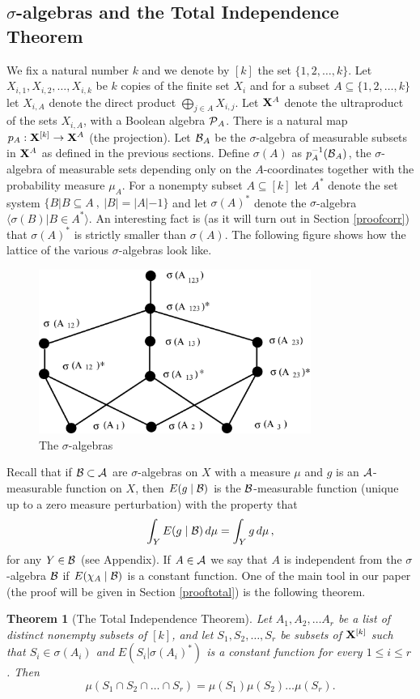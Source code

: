 \documentclass [11pt] {article}
\newtheorem{theorem}{Theorem}
\def\cA{\mbox{$\cal A$}}
\def\cB{\mbox{$\cal B$}}
\def\cA{\mbox{$\cal A$}}
\def\cB{\mbox{$\cal B$}}
\def\cP{\mbox{$\cal P$}}
\def\to{\rightarrow}
\def\xo{{\bf X}}
\def\xok{\xo^{[k]}}
\begin{document}
\subsection{$\sigma$-algebras and the Total Independence
  Theorem}
We fix a natural number $k$ and we denote by $[k]$ the set $\{1,2,\dots,k\}$.
 Let $X_{i,1},X_{i,2},\dots,X_{i,k}$ be $k$ copies of the finite set $X_i$ and
 for a subset
 $A\subseteq\{1,2,\dots,k\}$ let $X_{i,A}$ denote the direct
 product $\bigoplus_{j\in A}X_{i,j}$.
Let $\xo^A$ denote the ultraproduct of the sets $X_{i,A}$, with a Boolean
algebra $\cP_A$.
 There is a natural
 map $p_A:\xok\to \xo^A$ (the projection). Let $\cB_A$ be the
$\sigma$-algebra of measurable subsets in $\xo^A$ as defined in the previous
sections. Define $\sigma(A)$ as $p_A^{-1}(\cB_A)$, the $\sigma$-algebra
of measurable sets depending only on the $A$-coordinates together with
the probability measure $\mu_A$.
For a nonempty subset $A\subseteq [k]$ let $A^*$ denote the
set system $\{B|B\subseteq
A~,~|B|=|A|-1\}$ and let $\sigma(A)^*$ denote the $\sigma$-algebra $\langle
\sigma(B)|B\in A^*\rangle$. An interesting fact is (as it will turn out in
Section \ref{proofcorr}) that $\sigma(A)^*$ is strictly smaller
than $\sigma(A)$. The following figure shows how the lattice of the
various $\sigma$-algebras look like.
\begin{figure}[h]
 \begin{center}
    \includegraphics[width=3.5in]{SAVE.eps}
 \end{center}

  \caption{The $\sigma$-algebras}
  \label{fig-label}
\end{figure}
Recall that if $\cB\subset\cA$ are $\sigma$-algebras on $X$ with  a measure
$\mu$
 and
$g$ is an $\cA$-measurable function on $X$, then $E(g\mid \cB)$ is
the $\cB$-measurable function (unique up to a zero measure perturbation)
 with the property
that
$$\int_Y E(g\mid \cB)\,d\mu=\int_Y g \,d\mu\,,$$
for any $Y\in\cB$ (see Appendix).
If $A\in\cA$ we say that $A$ is independent from the $\sigma$-algebra
$\cB$ if $E(\chi_A\mid\cB)$ is a constant function.
One of the main tool in our paper (the proof will be given in
Section \ref{prooftotal}) is the following theorem.
\begin{theorem}[The Total Independence Theorem]\label{totalindep}
 Let $A_1,A_2,\dots A_r$ be
  a list of distinct nonempty
  subsets of $[k]$, and let $S_1,S_2,\dots,S_r$ be subsets of $\xok$ such
  that $S_i\in\sigma(A_i)$ and $E(S_i|\sigma(A_i)^*)$ is a constant
function for
  every $1\leq i\leq r$. Then
$$\mu(S_1\cap S_2\cap\dots\cap S_r)=\mu(S_1)\mu(S_2)\dots\mu(S_r).$$
\end{theorem}
\end{document}
